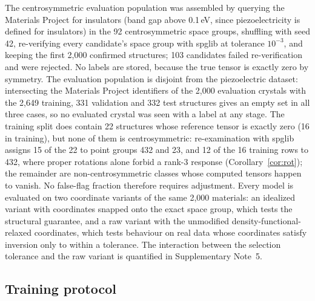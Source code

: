 The centrosymmetric evaluation population was assembled by querying the Materials Project for insulators (band gap above 0.1\,eV, since piezoelectricity is defined for insulators) in the 92 centrosymmetric space groups, shuffling with seed 42, re-verifying every candidate's space group with spglib at tolerance $10^{-3}$, and keeping the first 2,000 confirmed structures; 103 candidates failed re-verification and were rejected. No labels are stored, because the true tensor is exactly zero by symmetry. The evaluation population is disjoint from the piezoelectric dataset: intersecting the Materials Project identifiers of the 2,000 evaluation crystals with the 2,649 training, 331 validation and 332 test structures gives an empty set in all three cases, so no evaluated crystal was seen with a label at any stage. The training split does contain 22 structures whose reference tensor is exactly zero (16 in training), but none of them is centrosymmetric: re-examination with spglib assigns 15 of the 22 to point groups 432 and 23, and 12 of the 16 training rows to 432, where proper rotations alone forbid a rank-3 response (Corollary~\ref{cor:rot}); the remainder are non-centrosymmetric classes whose computed tensors happen to vanish. No false-flag fraction therefore requires adjustment. Every model is evaluated on two coordinate variants of the same 2,000 materials: an idealized variant with coordinates snapped onto the exact space group, which tests the structural guarantee, and a raw variant with the unmodified density-functional-relaxed coordinates, which tests behaviour on real data whose coordinates satisfy inversion only to within a tolerance. The interaction between the selection tolerance and the raw variant is quantified in Supplementary Note~5.

\subsection*{Training protocol}


